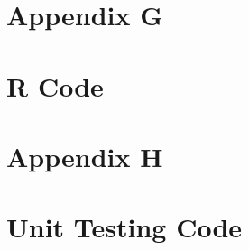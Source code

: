 \newpage
\section*{Appendix G}
\section*{R Code}
\label{append:g}

\newpage
\section*{Appendix H}
\section*{Unit Testing Code}
\label{append:h}
